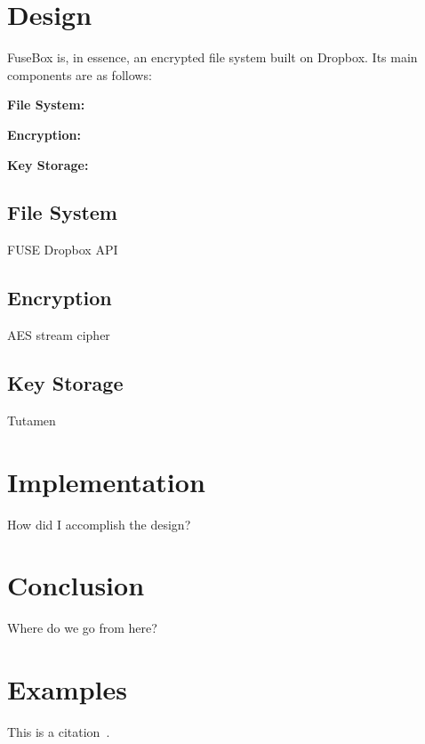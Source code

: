 \documentclass[11pt,twocolumn,letterpaper]{article}
\newcommand{\appname}{FuseBox }
\newcommand{\custos}{Tutamen }
\begin{document}
\section{Design}
\label{sec:design}
\appname is, in essence, an encrypted file system built on
Dropbox. Its main components are as follows:
\par {\bf File System:} 
\par {\bf Encryption:} 
\par {\bf Key Storage:}  

\subsection{File System}
\label{sec:fs}
FUSE  Dropbox API

\subsection{Encryption}
\label{sec:enc}
AES stream cipher

\subsection{Key Storage}
\label{sec:keystorage}
\custos

\section{Implementation}
\label{sec:implementation}

How did I accomplish the design?

\section{Conclusion}
\label{sec:conclusion}

Where do we go from here?

\section{Examples}
\label{sec:ex}

\noindent
This is a citation~\cite{exampleref1}.


\end{document}
